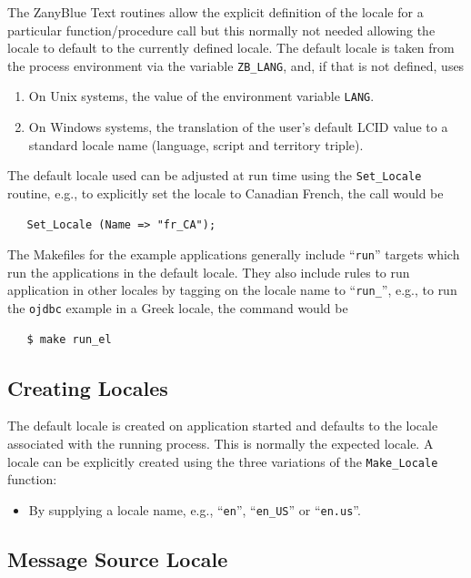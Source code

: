 The ZanyBlue Text routines allow the explicit definition of the locale for a
particular function/procedure call but this normally not needed allowing the
locale to default to the currently defined locale.  The default locale is
taken from the process environment via the variable \texttt{ZB\_LANG}, and,
if that is not defined, uses
\begin{enumerate}
\item On Unix systems, the value of the environment variable \texttt{LANG}.
\item On Windows systems, the translation of the user's default LCID value
      to a standard locale name (language, script and territory triple).
\end{enumerate}
The default locale used can be adjusted at run time using the
\texttt{Set\_Locale} routine, e.g., to explicitly set the locale to Canadian
French, the call would be
\begin{xmpl}
\begin{verbatim}
   Set_Locale (Name => "fr_CA");
\end{verbatim}
\end{xmpl}

The Makefiles for the example applications generally include ``\texttt{run}''
targets which run the applications in the default locale.  They also include
rules to run application in other locales by tagging on the locale name to
``\texttt{run\_}'', e.g., to run the \texttt{ojdbc} example in a Greek locale,
the command would be
\begin{xmpl}
\begin{verbatim}
   $ make run_el
\end{verbatim}
\end{xmpl}

\subsection{Creating Locales}

The default locale is created on application started and defaults to the locale
associated with the running process.  This is normally the expected locale.
A locale can be explicitly created using the three variations of the
\texttt{Make\_Locale} function:
\begin{itemize}
\item	By supplying a locale name, e.g., ``\texttt{en}'', ``\texttt{en\_US}''
        or ``\texttt{en.us}''.
\end{itemize}

\subsection{Message Source Locale}
\label{sec:sourcelocale}

